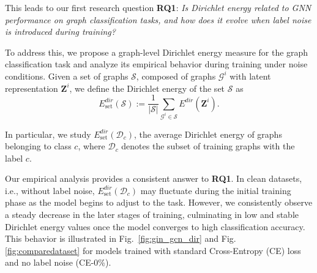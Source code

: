 
This leads to our first research question \textbf{RQ1}:\textit{ Is Dirichlet energy related to GNN performance on graph classification tasks, and how does it evolve when label noise is introduced during training?} 

To address this, we propose a graph-level Dirichlet energy measure for the graph classification task and analyze its empirical behavior during training under noise conditions.
Given a set of graphs $\mathcal{S}$, composed of graphs $\mathcal{G}^i$ with latent representation $\mathbf{Z}^i$, we define the Dirichlet energy of the set $\mathcal{S}$ as
\begin{equation}
    \label{eq: avg_dirichlet}
   E^{dir}_{\text{set}}(\mathcal{S}) := \frac{1}{|\mathcal{S}|} \sum_{\mathcal{G}^i \in \mathcal{S}}  E^{dir}(\mathbf{Z}^i).
\end{equation}


In particular, we study $E^{dir}_\text{set}(\mathcal{D}_c)$, the average Dirichlet energy of graphs belonging to class $c$, where $\mathcal{D}_c$ denotes the subset of training graphs with the label $c$. 


Our empirical analysis provides a consistent answer to \textbf{RQ1}. In clean datasets, i.e., without label noise, \( E^{dir}_{\text{set}}(\mathcal{D}_c) \) may fluctuate during the initial training phase as the model begins to adjust to the task. However, we consistently observe a steady decrease in the later stages of training, culminating in low and stable Dirichlet energy values once the model converges to high classification accuracy. This behavior is illustrated in Fig.~\ref{fig:gin_gcn_dir} and Fig. \ref{fig:comparedataset} for models trained with standard Cross-Entropy (CE) loss and no label noise (CE-0\%).

